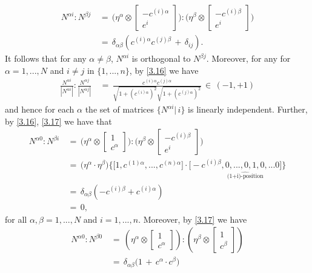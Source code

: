 \documentclass{amsart}
\theoremstyle{definition}
\numberwithin{equation}{section}
\begin{document}
\[
\begin{split}
N^{{\alpha} i} : N^{{\beta} j} \, & =\,  \Big(\eta^{\alpha} {\otimes} 
\left[
\begin{array}{c}
-c^{(i){\alpha}}\\
\hline e^i
\end{array}
\right]  \Big)
 :   \Big(\eta^{\beta} {\otimes} 
\left[
\begin{array}{c}
-c^{(i){\beta}}\\
\hline e^i
\end{array}
\right]  \Big)
\\
&=\, {\delta}_{{\alpha} {\beta}}\left(c^{(i){\alpha}}c^{(j){\beta}} \, +\, {\delta}_{ij}\right).
\end{split}
\]
It follows that for any ${\alpha}\neq {\beta}$, $N^{{\alpha} i}$ is orthogonal to $N^{{\beta} j}$. Moreover, for any for ${\alpha}=1,...,N$ and $i\neq j$ in $\{1,...,n\}$, by \eqref{3.16} we have
\[
\begin{split}
\frac{N^{{\alpha} i}}{| N^{{\alpha} i} |} : \frac{N^{{\alpha} j}}{| N^{{\alpha} j} |}  \, & 
=\,  \frac{  c^{(i){\alpha}}c^{(j){\alpha}}  }{\sqrt{1+(c^{(i){\alpha}})^2} \sqrt{1+(c^{(j){\alpha}})^2} } \, \in \, (-1,+1)
\end{split}
\]
and hence for each ${\alpha}$ the set of matrices $\{N^{{\alpha} i}|\,i\}$ is linearly independent. Further, by \eqref{3.16},  \eqref{3.17} we have that
\[
\begin{split}
N^{{\alpha} 0} : N^{{\beta} i} \, & =\, \Big(\eta^{\alpha} {\otimes} 
\left[
\begin{array}{c}
1\\
\hline c^{\alpha}
\end{array}
\right]  \Big) :   \Big(\eta^{\beta} {\otimes} 
\left[
\begin{array}{c}
-c^{(i){\beta}}\\
\hline e^i
\end{array}
\right]  \Big)
\\
& =\, \big(\eta^{\alpha} \cdot \eta^{\beta}\big) \Big\{ \big[1,c^{(1){\alpha}},...,c^{(n){\alpha}}\big] \cdot  \underset{\quad\quad \ \ \ \ \ \ \widehat{\text{(1+i)-position}}}{ \big[-c^{(i){\beta}},0,...,0,1,0,...0\big] } \Big\}\\
&=\, {\delta}_{{\alpha} {\beta}} \left( -c^{(i){\beta}} + c^{(i){\alpha}}\right)\\
&=\, 0,
\end{split}
\]
for all ${\alpha},{\beta}=1,...,N$ and $i=1,...,n$. Moreover, by \eqref{3.17} we have
\[
\begin{split}
N^{{\alpha} 0} : N^{{\beta} 0}\, &=\, \left(\eta^{\alpha} {\otimes} 
\left[
\begin{array}{c}
1\\
\hline c^{\alpha}
\end{array}
\right]\right) : \left(\eta^{\beta} {\otimes} 
\left[
\begin{array}{c}
1\\
\hline c^{\beta}
\end{array}
\right] \right)\\
& =\, {\delta}_{{\alpha} {\beta}}\big(1\,+\,c^{\alpha} \cdot c^{\beta} \big)
\end{split}
\]
\end{document}
